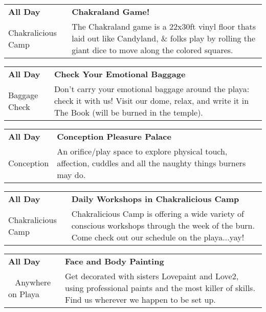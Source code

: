 \begin{tabular}{ p{1in} p{2.2in} }
    \textbf{All Day} & \textbf{Chakraland Game!} \\
    Chakralicious Camp \newline  & The Chakraland game is a 22x30ft vinyl floor thats laid out like Candyland, \& folks play by rolling the giant dice to move along the colored squares. \\
    \hline 
\end{tabular}
    
\begin{tabular}{ p{1in} p{2.2in} }
    \textbf{All Day} & \textbf{Check Your Emotional Baggage} \\
    Baggage Check \newline  & Don't carry your emotional baggage around the playa: check it with us! Visit our dome, relax, and write it in The Book (will be burned in the temple). \\
    \hline 
\end{tabular}
    
\begin{tabular}{ p{1in} p{2.2in} }
    \textbf{All Day} & \textbf{Conception Pleasure Palace} \\
    Conception \newline  & An orifice/play space to explore physical touch, affection, cuddles and all the naughty things burners may do. \\
    \hline 
\end{tabular}
    
\begin{tabular}{ p{1in} p{2.2in} }
    \textbf{All Day} & \textbf{Daily Workshops in Chakralicious Camp} \\
    Chakralicious Camp \newline  & Chakralicious Camp is offering a wide variety of conscious workshops through the week of the burn. Come check out our schedule on the playa...yay! \\
    \hline 
\end{tabular}
    
\begin{tabular}{ p{1in} p{2.2in} }
    \textbf{All Day} & \textbf{Face and Body Painting} \\
    ~ \newline Anywhere on Playa & Get decorated with sisters Lovepaint and Love2, using professional paints and the most killer of skills. Find us wherever we happen to be set up. \\
    \hline 
\end{tabular}
    

